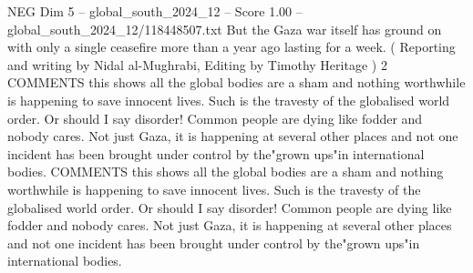 \begin{textsample}{NEG Dim 5 – global\_south\_2024\_12 – Score 1.00 – global\_south\_2024\_12/118448507.txt}
But the Gaza war itself has ground on with only a single ceasefire more than a year ago lasting for a week. ( Reporting and writing by Nidal al-Mughrabi, Editing by Timothy Heritage ) 2 COMMENTS this shows all the global bodies are a sham and nothing worthwhile is happening to save innocent lives.
Such is the travesty of the globalised world order.
Or should I say disorder!
Common people are dying like fodder and nobody cares.
Not just Gaza, it is happening at several other places and not one incident has been brought under control by the"grown ups"in international bodies.
COMMENTS this shows all the global bodies are a sham and nothing worthwhile is happening to save innocent lives.
Such is the travesty of the globalised world order.
Or should I say disorder!
Common people are dying like fodder and nobody cares.
Not just Gaza, it is happening at several other places and not one incident has been brought under control by the"grown ups"in international bodies.

\end{textsample}
